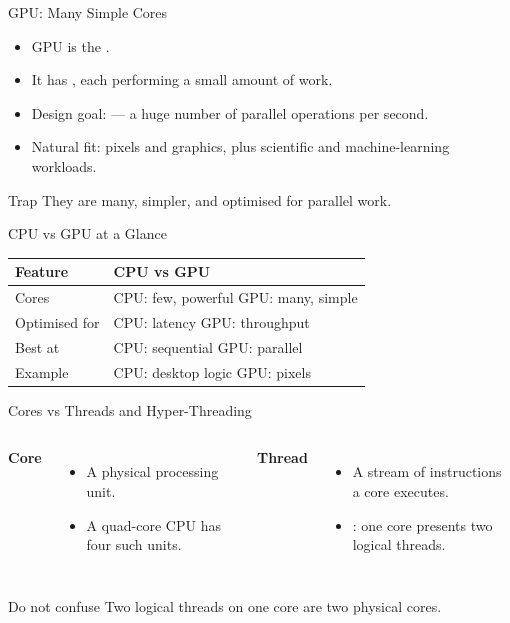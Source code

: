 \documentclass[aspectratio=169]{beamer}
\begin{document}
\begin{frame}{GPU: Many Simple Cores}
  \begin{itemize}
    \item GPU is the .
    \item It has , each performing a small amount of
      work.
    \item Design goal:  --- a huge number of parallel
      operations per second.
    \item Natural fit: pixels and graphics, plus scientific and
      machine-learning workloads.
  \end{itemize}
  \begin{alertblock}{Trap}
     They are many,
    simpler, and optimised for parallel work.
  \end{alertblock}
\end{frame}

\begin{frame}{CPU vs GPU at a Glance}
  \begin{center}
    \begin{tabular}{ll}
      \toprule
      \textbf{Feature} & \textbf{CPU vs GPU} \\
      \midrule
      Cores & CPU: few, powerful \quad GPU: many, simple \\
      Optimised for & CPU: latency \quad GPU: throughput \\
      Best at & CPU: sequential \quad GPU: parallel \\
      Example & CPU: desktop logic \quad GPU: pixels \\
      \bottomrule
    \end{tabular}
  \end{center}
  \vspace{0.3cm}
\end{frame}

\begin{frame}{Cores vs Threads and Hyper-Threading}
  \begin{columns}[T]
      \textbf{Core}
      \begin{itemize}
        \item A physical processing unit.
        \item A quad-core CPU has four such units.
      \end{itemize}
      \textbf{Thread}
      \begin{itemize}
        \item A stream of instructions a core executes.
        \item {}: one core presents two logical threads.
      \end{itemize}
  \end{columns}
  \vspace{0.2cm}
  \begin{block}{Do not confuse}
    Two logical threads on one core are  two physical cores.
  \end{block}
\end{frame}
\end{document}
